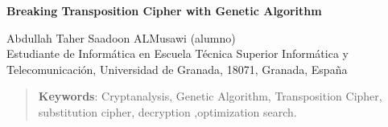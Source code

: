 \thispagestyle{empty}

\vspace*{\fill} %

\begin{center}
	\textbf{Breaking Transposition Cipher with Genetic Algorithm}\\
	
	\vspace{0.3cm}
	
	Abdullah Taher Saadoon ALMusawi (alumno)	\\
	
	\footnotesize{Estudiante de Informática en Escuela Técnica Superior Informática y Telecomunicación, Universidad de Granada, 18071, Granada, España} \\
	
\end{center}


\begin{abstract}

\noindent \textbf{Keywords}: Cryptanalysis, Genetic Algorithm, Transposition Cipher, substitution cipher, decryption ,optimization search. 

\vspace{0.2cm}



\end{abstract}

\vspace*{\fill} %


\newpage